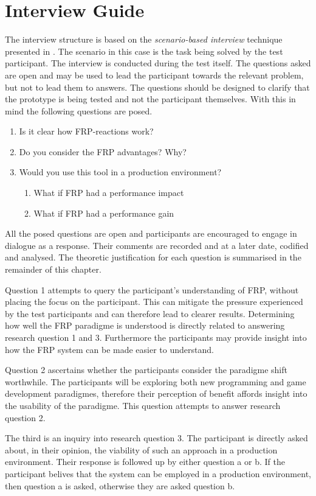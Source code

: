 \chapter{Interview Guide}
The interview structure is based on the \textit{scenario-based interview} technique presented in \cite{blackwell2004champagne}. The scenario in this case is the task being solved by the test participant. The interview is conducted during the test itself. The questions asked are open and may be used to lead the participant towards the relevant problem, but not to lead them to answers. The questions should be designed to clarify that the prototype is being tested and not the participant themselves. With this in mind the following questions are posed.

\begin{enumerate}
  \item Is it clear how FRP-reactions work?
  \item Do you consider the FRP advantages? Why?
  \item Would you use this tool in a production environment?
  \begin{enumerate}
    \item What if FRP had a performance impact
    \item What if FRP had a performance gain
  \end{enumerate}
\end{enumerate}

All the posed questions are open and participants are encouraged to engage in dialogue as a response. Their comments are recorded and at a later date, codified and analysed. The theoretic justification for each question is summarised in the remainder of this chapter.

Question 1 attempts to query the participant's understanding of \gls{FRP}, without placing the focus on the participant. This can mitigate the pressure experienced by the test participants and can therefore lead to clearer results. Determining how well the FRP paradigme is understood is directly related to answering research question 1 and 3. Furthermore the participants may provide insight into how the FRP system can be made easier to understand.

Question 2 ascertains whether the participants consider the paradigme shift worthwhile. The participants will be exploring both new programming and game development paradigmes, therefore their perception of benefit affords insight into the usability of the paradigme. This question attempts to answer research question 2.

The third is an inquiry into research question 3. The participant is directly asked about, in their opinion, the viability of such an approach in a production environment. Their response is followed up by either question a or b. If the participant belives that the system can be employed in a production environment, then question a is asked, otherwise they are asked question b.

